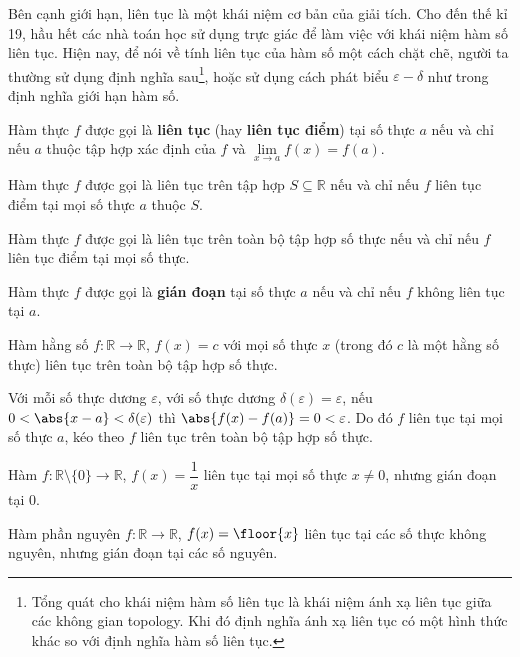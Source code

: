 Bên cạnh giới hạn, liên tục là một khái niệm cơ bản của giải tích. Cho đến thế kỉ 19, hầu hết các nhà toán học sử dụng trực giác để làm việc với khái niệm hàm số liên tục. Hiện nay, để nói về tính liên tục của hàm số một cách chặt chẽ, người ta thường sử dụng định nghĩa sau\footnote{Tổng quát cho khái niệm hàm số liên tục là khái niệm ánh xạ liên tục giữa các không gian topology. Khi đó định nghĩa ánh xạ liên tục có một hình thức khác so với định nghĩa hàm số liên tục.}, hoặc sử dụng cách phát biểu $\varepsilon-\delta$ như trong định nghĩa giới hạn hàm số.

\begin{definition}
    Hàm thực $f$ được gọi là \textbf{liên tục} (hay \textbf{liên tục điểm}) tại số thực $a$ nếu và chỉ nếu $a$ thuộc tập hợp xác định của $f$ và $\lim\limits_{x\to a} f(x) = f(a)$.

    Hàm thực $f$ được gọi là liên tục trên tập hợp $S\subseteq \mathbb{R}$ nếu và chỉ nếu $f$ liên tục điểm tại mọi số thực $a$ thuộc $S$.

    Hàm thực $f$ được gọi là liên tục trên toàn bộ tập hợp số thực nếu và chỉ nếu $f$ liên tục điểm tại mọi số thực.

    Hàm thực $f$ được gọi là \textbf{gián đoạn} tại số thực $a$ nếu và chỉ nếu $f$ không liên tục tại $a$.
\end{definition}

\begin{example}\label{example:constant-function-is-continuous}
    Hàm hằng số $f: \mathbb{R}\to \mathbb{R}$, $f(x) = c$ với mọi số thực $x$ (trong đó $c$ là một hằng số thực) liên tục trên toàn bộ tập hợp số thực.

    Với mỗi số thực dương $\varepsilon$, với số thực dương $\delta(\varepsilon) = \varepsilon$, nếu $0 < \abs{x - a} < \delta(\varepsilon)$ thì $\abs{f(x) - f(a)} = 0 < \varepsilon$. Do đó $f$ liên tục tại mọi số thực $a$, kéo theo $f$ liên tục trên toàn bộ tập hợp số thực.
\end{example}

\begin{example}
    Hàm $f: \mathbb{R}\setminus\{0\}\to \mathbb{R}$, $f(x) = \dfrac{1}{x}$ liên tục tại mọi số thực $x\ne 0$, nhưng gián đoạn tại $0$.
\end{example}

\begin{example}
    Hàm phần nguyên $f: \mathbb{R}\to \mathbb{R}$, $f(x) = \floor{x}$ liên tục tại các số thực không nguyên, nhưng gián đoạn tại các số nguyên.
\end{example}


